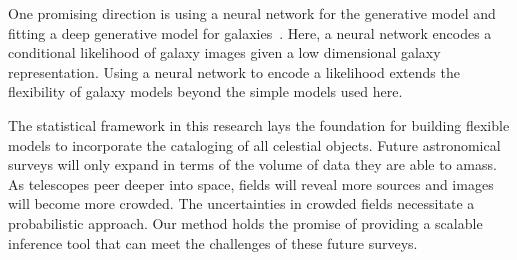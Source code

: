 One promising direction is using a neural network for the generative model and fitting a deep generative model for galaxies~\cite{Arcelin_2020, lanusse2020deep, Reiman_2019_gans_deblend, Regier2015ADG}. 
Here, a neural network encodes a conditional likelihood of galaxy images given a low dimensional galaxy representation. 
Using a neural network to encode a likelihood extends the flexibility of galaxy models beyond the simple models used here. 




The statistical framework in this research lays the foundation for building flexible models to incorporate the cataloging of all celestial objects. 
Future astronomical surveys will only expand in terms of the volume of data they are able to amass. 
As telescopes peer deeper into space, fields will reveal more sources and images will become more crowded. 
The uncertainties in crowded fields necessitate a probabilistic approach. 
Our method holds the promise of providing  a scalable inference tool that can meet the challenges of these future surveys. 






